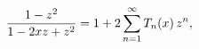 \[\frac{1-z^{2}}{1-2xz+z^{2}}=1+2\sum_{n=1}^{\infty}\mathop{T_{n}\/}\nolimits\!%
\left(x\right)z^{n},\]